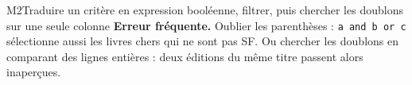 \begin{fichemethode}{M2}{Traduire un critère en expression booléenne, filtrer, puis chercher les doublons sur une seule colonne}
\textbf{Erreur fréquente.} Oublier les parenthèses : \lstinline{a and b or c} sélectionne
aussi les livres chers qui ne sont pas SF. Ou chercher les doublons en comparant des lignes
entières : deux éditions du même titre passent alors inaperçues.

\end{fichemethode}
